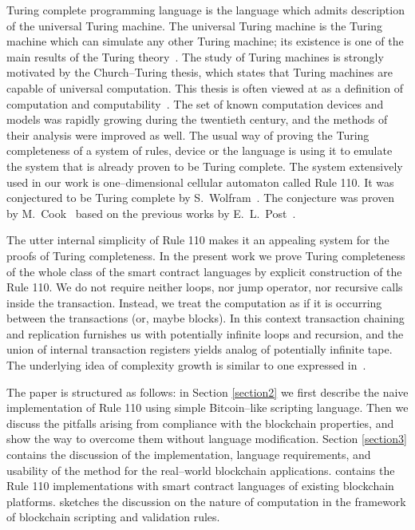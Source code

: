 \documentclass[runningheads]{llncs}
\begin{document}
    Turing complete programming language is the language which admits
    description of the universal Turing machine. The universal Turing machine is
    the Turing machine which can simulate any other Turing machine; its
    existence is one of the main results of the Turing
    theory~\cite{turing1937computable}. The study of Turing machines is strongly
    motivated by the Church--Turing thesis, which states that Turing machines
    are capable of universal computation. This thesis is often viewed at as a
    definition of computation and computability~\cite{turing1939systems}. The
    set of known computation devices and models was rapidly growing during the
    twentieth century, and the methods of their analysis were improved as well.
    The usual way of proving the Turing completeness of a system of rules,
    device or the language is using it to emulate the system that is already
    proven to be Turing complete.  The system extensively used in our work is
    one--dimensional cellular automaton called Rule 110. It was conjectured to
    be Turing complete by S.~Wolfram~\cite{wolfram1986theory}. The conjecture
    was proven by M.~Cook~\cite{cook2004universality} based on the previous
    works by E.~L.~Post~\cite{post1943formal}.

    The utter internal simplicity of Rule 110 makes it an appealing system for
    the proofs of Turing completeness. In the present work we prove Turing
    completeness of the whole class of the smart contract languages by explicit
    construction of the Rule 110. We do not require neither loops, nor jump
    operator, nor recursive calls inside the transaction. Instead, we treat the
    computation as if it is occurring between the transactions (or, maybe
    blocks). In this context transaction chaining and replication furnishes us
    with potentially infinite loops and recursion, and the union of internal
    transaction registers yields analog of potentially infinite tape. The
    underlying idea of complexity growth is similar to one expressed
    in~\cite{von1951general}.

    The paper is structured as follows: in Section \ref{section2} we first
    describe the naive implementation of Rule 110 using simple Bitcoin--like
    scripting language.  Then we discuss the pitfalls arising from compliance
    with the blockchain properties, and show the way to overcome them without
    language modification.  Section \ref{section3} contains the discussion of
    the implementation, language requirements, and usability of the method for
    the real--world blockchain applications.  contains the
    Rule 110 implementations with smart contract languages of existing
    blockchain platforms.  sketches the discussion on the
    nature of computation in the framework of blockchain scripting and
    validation rules.
\end{document}
